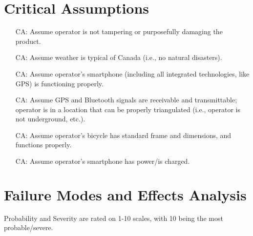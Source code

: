 \documentclass{article}
\newcounter{canum} %
\begin{document}
\section{Critical Assumptions}

\begin{itemize}

\item[CA\refstepcounter{canum}\thecanum\label{CA1}:] Assume operator is not tampering or purposefully damaging the product.
\item[CA\refstepcounter{canum}\thecanum\label{CA2}:] Assume weather is typical of Canada (i.e., no natural disasters).
\item[CA\refstepcounter{canum}\thecanum\label{CA3}:] Assume operator's smartphone (including all integrated technologies, like GPS) is functioning properly.
\item[CA\refstepcounter{canum}\thecanum\label{CA4}:] Assume GPS and Bluetooth signals are receivable and transmittable; operator is in a location that can be properly triangulated (i.e., operator is not underground, etc.). 
\item[CA\refstepcounter{canum}\thecanum\label{CA5}:] Assume operator's bicycle has standard frame and dimensions, and functions properly.
\item[CA\refstepcounter{canum}\thecanum\label{CA6}:] Assume operator's smartphone has power/is charged. 

\end{itemize}


\section{Failure Modes and Effects Analysis}
Probability and Severity are rated on 1-10 scales, with 10 being the most probable/severe. 
\end{document}
